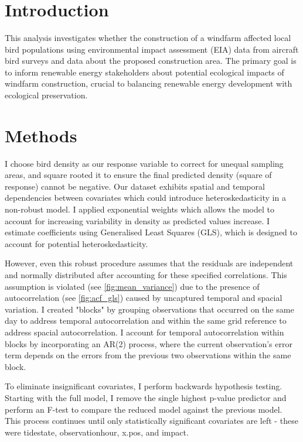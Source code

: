 \documentclass[11pt]{article}
\title{
	\vspace{-3.5cm}
	\resizebox{\textwidth}{!}{
		Impact Assessment of Windfarm Construction on Animal Density
	}
	\vspace{-2.5cm}
}
\date{}
\begin{document}
\maketitle

\section*{Introduction}
\vspace{-0.35cm}
 This analysis investigates whether the construction of a windfarm affected local bird populations using environmental impact assessment (EIA) data from aircraft bird surveys and data about the proposed construction area. The primary goal is to inform renewable energy stakeholders about potential ecological impacts of windfarm construction, crucial to balancing renewable energy development with ecological preservation. 

\vspace{-0.4cm}
\section*{Methods}
\vspace{-0.35cm}
I choose bird density as our response variable to correct for unequal sampling areas, and square rooted it to ensure the final predicted density (square of response) cannot be negative. Our dataset exhibits spatial and temporal dependencies between covariates which could introduce heteroskedasticity in a non-robust model. I applied exponential weights which allows the model to account for increasing variability in density as predicted values increase. I estimate coefficients using Generalised Least Squares (GLS), which is designed to account for potential heteroskedasticity.

However, even this robust procedure assumes that the residuals are independent and normally distributed after accounting for these specified correlations. This assumption is violated (see \ref{fig:mean_variance}) due to the presence of autocorrelation (see \ref{fig:acf_gls}) caused by uncaptured temporal and spacial variation. I created "blocks" by grouping observations that occurred on the same day to address temporal autocorrelation and within the same grid reference to address spacial autocorrelation. I account for temporal autocorrelation within blocks by incorporating an AR(2) process, where the current observation's error term depends on the errors from the previous two observations within the same block.

To eliminate insignificant covariates, I perform backwards hypothesis testing. Starting with the full model, I remove the single highest p-value predictor and perform an F-test to compare the reduced model against the previous model. This process continues until only statistically significant covariates are left - these were tidestate, observationhour, x.pos, and impact. 
\end{document}
